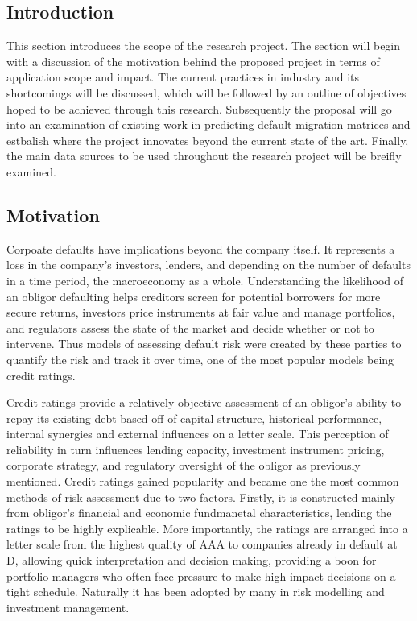 \documentclass[10pt]{article}
\begin{document}
\begin{multicols*}{2}

\section{Introduction}\label{introduction}

This section introduces the scope of the research project. The section will begin with a discussion of the motivation behind the proposed project in terms of application scope and impact.
The current practices in industry and its shortcomings will be discussed, which will be followed by an outline of objectives hoped to be achieved through this research. 
Subsequently the proposal will go into an examination of existing work in predicting default migration matrices and estbalish where the project innovates beyond the current state of the art. 
Finally, the main data sources to be used throughout the research project will be breifly examined.  
 
\subsection{Motivation}\label{motivation}

Corpoate defaults have implications beyond the company itself. It represents a loss in the company's investors, lenders, and depending on the number of defaults in a time period, the macroeconomy as a whole.
Understanding the likelihood of an obligor defaulting helps creditors screen for potential borrowers for more secure returns, investors price instruments at fair value and manage portfolios, and regulators assess the state of the market and decide whether or not to intervene.
Thus models of assessing default risk were created by these parties to quantify the risk and track it over time, one of the most popular models being credit ratings.  

Credit ratings provide a relatively objective assessment of an obligor's ability to repay its existing debt based off of capital structure, historical performance, internal synergies and external influences on a letter scale.
This perception of reliability in turn influences lending capacity, investment instrument pricing, corporate strategy, and regulatory oversight of the obligor as previously mentioned. 
Credit ratings gained popularity and became one the most common methods of risk assessment due to two factors. Firstly, it is constructed mainly from obligor's financial and economic fundmanetal characteristics, lending the ratings to be highly explicable.
More importantly, the ratings are arranged into a letter scale from the highest quality of AAA to companies already in default at D, allowing quick interpretation and decision making, providing a boon for portfolio managers who often face pressure to make high-impact decisions on a tight schedule.
Naturally it has been adopted by many in risk modelling and investment management.


\end{multicols*}
\end{document}
